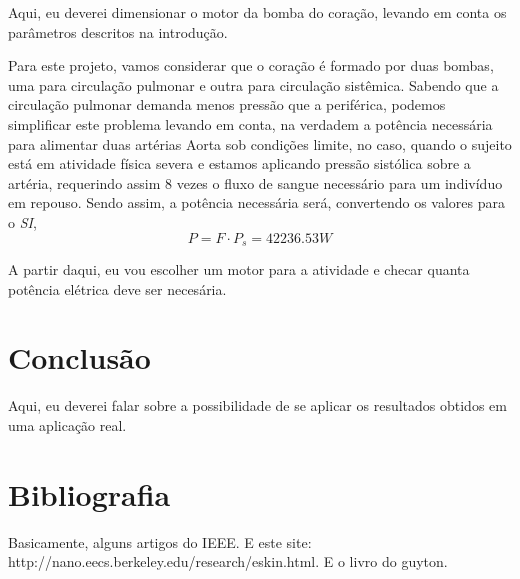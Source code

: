 \documentclass[12pt, a4paper, twoside]{article}
\begin{document}
Aqui, eu deverei dimensionar o motor da bomba do coração, levando em conta os parâmetros descritos na introdução.

Para este projeto, vamos considerar que o coração é formado por duas bombas, uma para circulação pulmonar e outra para circulação sistêmica. Sabendo que a circulação pulmonar demanda menos pressão que a periférica, podemos simplificar este problema levando em conta, na verdadem a potência necessária para alimentar duas artérias Aorta sob condições limite, no caso, quando o sujeito está em atividade física severa e estamos aplicando pressão sistólica sobre a artéria, requerindo assim 8 vezes o fluxo de sangue necessário para um indivíduo em repouso. Sendo assim, a potência necessária será, convertendo os valores para o \textit{SI},
$$ P = F \cdot P_s = 42236.53 W $$

A partir daqui, eu vou escolher um motor para a atividade e checar quanta potência elétrica deve ser necesária.

\section{Conclusão}

Aqui, eu deverei falar sobre a possibilidade de se aplicar os resultados obtidos em uma aplicação real.

\section{Bibliografia}

Basicamente, alguns artigos do IEEE. E este site: http://nano.eecs.berkeley.edu/research/eskin.html. E o livro do guyton.
\end{document}
